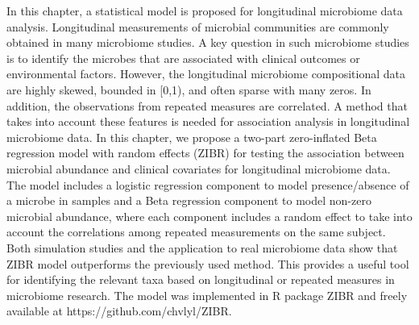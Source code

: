  \label{chpt4:ZIBR}


In this chapter, a statistical model is proposed for longitudinal microbiome data analysis. Longitudinal measurements of microbial communities are commonly obtained in many microbiome studies. A key question in such microbiome studies is to identify the microbes that are associated with clinical outcomes or environmental factors. However, the longitudinal microbiome compositional data are highly skewed, bounded in [0,1), and often sparse with many zeros. In addition, the observations from repeated measures are correlated. A method that takes into account these features is needed for association analysis in longitudinal microbiome data. In this chapter, we propose a two-part zero-inflated Beta regression model with random effects (ZIBR) for testing the association between microbial abundance and clinical covariates for longitudinal microbiome data. The model includes a logistic regression component to model presence/absence of a microbe in samples and a Beta regression component to model non-zero microbial abundance, where each component includes a random effect to take into account the correlations among repeated measurements on the same subject. Both simulation studies and the application to real microbiome data show that ZIBR model outperforms the previously used method. This provides a useful tool for identifying the relevant taxa based on longitudinal or repeated measures in microbiome research. The model was implemented in R package ZIBR and freely available at https://github.com/chvlyl/ZIBR.



